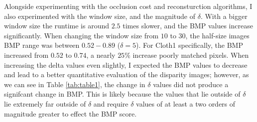 \documentclass[11pt,a4paper]{article}
\begin{document}
Alongside experimenting with the occlusion cost and reconsturction algorithms, I also experimented with the window size, and the magnitude of $\delta$.
 With a bigger window size the runtime is around $2.5$ times slower, and the BMP values increase significantly. When changing the
window size from $10$ to $30$, the half-size images BMP range was between $0.52-0.89$ ($\delta = 5$). For Cloth1 specifically, the BMP increased from $0.52$ to $0.74$, a nearly $25\%$ increase poorly matched pixels. 
 When increasing the delta values even slightly, I expected the BMP values to decrease and lead to a better quantitative evaluation of the disparity images; however, as we can see in Table 
 \ref{tab:table1}, the change in $\delta$ values did not produce a signifcant change in BMP.  This is likely because the values 
 that lie outside of $\delta$ lie extremely far outside of $\delta$ and require $\delta$ values of at least a two orders of magnitude
 greater to effect the BMP score.

\printbibliography
\end{document}
